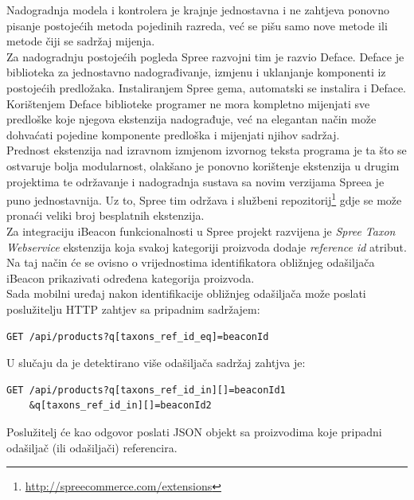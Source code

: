 Nadogradnja modela i kontrolera je krajnje jednostavna i ne zahtjeva ponovno pisanje postojećih metoda pojedinih razreda, već se pišu samo nove metode ili metode čiji se sadržaj mijenja.
\\
Za nadogradnju postojećih pogleda Spree razvojni tim je razvio Deface. 
Deface je biblioteka za jednostavno nadograđivanje, izmjenu i uklanjanje komponenti iz postojećih predložaka. 
Instaliranjem Spree gema, automatski se instalira i Deface. 
Korištenjem Deface biblioteke programer ne mora kompletno mijenjati sve predloške koje njegova ekstenzija nadograđuje, već na elegantan način može dohvaćati pojedine komponente predloška i mijenjati njihov sadržaj.
\\
Prednost ekstenzija nad izravnom izmjenom izvornog teksta programa je ta što se ostvaruje bolja modularnost, olakšano je ponovno korištenje ekstenzija u drugim projektima te održavanje i nadogradnja sustava sa novim verzijama Spreea je puno jednostavnija. 
Uz to, Spree tim održava i službeni repozitorij\footnote{\url{http://spreecommerce.com/extensions}} gdje se može pronaći veliki broj besplatnih ekstenzija.
\\

Za integraciju iBeacon funkcionalnosti u Spree projekt razvijena je \textit{Spree Taxon Webservice} ekstenzija koja svakoj kategoriji proizvoda dodaje \textit{reference id} atribut. 
Na taj način će se ovisno o vrijednostima identifikatora obližnjeg odašiljača iBeacon prikazivati određena kategorija proizvoda.
\\

Sada mobilni uređaj nakon identifikacije obližnjeg odašiljača može poslati poslužitelju HTTP zahtjev sa pripadnim sadržajem:
\begin{lstlisting}
GET /api/products?q[taxons_ref_id_eq]=beaconId
\end{lstlisting}

U slučaju da je detektirano više odašiljača sadržaj zahtjva je:
\begin{lstlisting}
GET /api/products?q[taxons_ref_id_in][]=beaconId1
	&q[taxons_ref_id_in][]=beaconId2
\end{lstlisting}

Poslužitelj će kao odgovor poslati JSON objekt sa proizvodima koje pripadni odašiljač (ili odašiljači) referencira.


